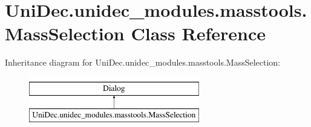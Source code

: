\hypertarget{class_uni_dec_1_1unidec__modules_1_1masstools_1_1_mass_selection}{}\section{Uni\+Dec.\+unidec\+\_\+modules.\+masstools.\+Mass\+Selection Class Reference}
\label{class_uni_dec_1_1unidec__modules_1_1masstools_1_1_mass_selection}
Inheritance diagram for Uni\+Dec.\+unidec\+\_\+modules.\+masstools.\+Mass\+Selection\+:\begin{figure}[H]
\begin{center}
\leavevmode
\includegraphics[height=2.000000cm]{class_uni_dec_1_1unidec__modules_1_1masstools_1_1_mass_selection}
\end{center}
\end{figure}
